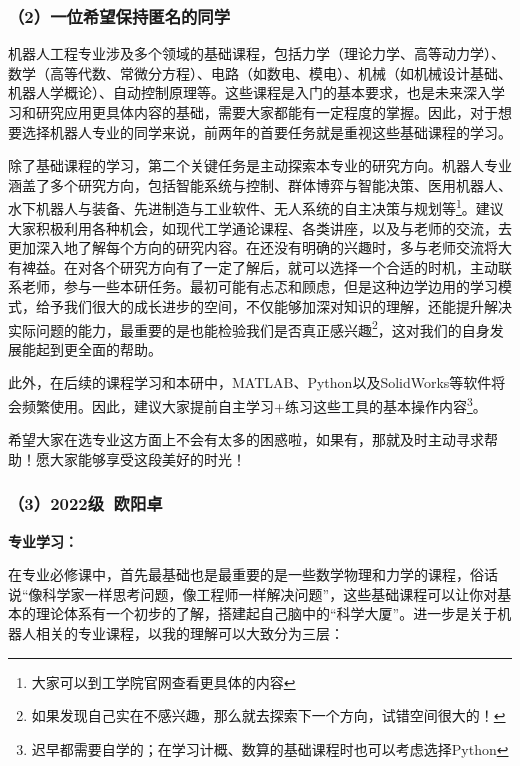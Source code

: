 \documentclass[11pt,oneside]{book}
\begin{document}
\subsubsection{（2）一位希望保持匿名的同学}
机器人工程专业涉及多个领域的基础课程，包括力学（理论力学、高等动力学）、数学（高等代数、常微分方程）、电路（如数电、模电）、机械（如机械设计基础、机器人学概论）、自动控制原理等。这些课程是入门的基本要求，也是未来深入学习和研究应用更具体内容的基础，需要大家都能有一定程度的掌握。因此，对于想要选择机器人专业的同学来说，前两年的首要任务就是重视这些基础课程的学习。

\vspace{10pt}

除了基础课程的学习，第二个关键任务是主动探索本专业的研究方向。机器人专业涵盖了多个研究方向，包括智能系统与控制、群体博弈与智能决策、医用机器人、水下机器人与装备、先进制造与工业软件、无人系统的自主决策与规划等\footnote{大家可以到工学院官网查看更具体的内容}。建议大家积极利用各种机会，如现代工学通论课程、各类讲座，以及与老师的交流，去更加深入地了解每个方向的研究内容。在还没有明确的兴趣时，多与老师交流将大有裨益。在对各个研究方向有了一定了解后，就可以选择一个合适的时机，主动联系老师，参与一些本研任务。最初可能有忐忑和顾虑，但是这种边学边用的学习模式，给予我们很大的成长进步的空间，不仅能够加深对知识的理解，还能提升解决实际问题的能力，最重要的是也能检验我们是否真正感兴趣\footnote{如果发现自己实在不感兴趣，那么就去探索下一个方向，试错空间很大的！}，这对我们的自身发展能起到更全面的帮助。

\vspace{10pt}

此外，在后续的课程学习和本研中，MATLAB、Python以及SolidWorks等软件将会频繁使用。因此，建议大家提前自主学习+练习这些工具的基本操作内容\footnote{迟早都需要自学的；在学习计概、数算的基础课程时也可以考虑选择Python}。

\vspace{10pt}

希望大家在选专业这方面上不会有太多的困惑啦，如果有，那就及时主动寻求帮助！愿大家能够享受这段美好的时光！

\subsubsection{（3）2022级\ 欧阳卓}
\textbf{专业学习：}

在专业必修课中，首先最基础也是最重要的是一些数学物理和力学的课程，俗话说“像科学家一样思考问题，像工程师一样解决问题”，这些基础课程可以让你对基本的理论体系有一个初步的了解，搭建起自己脑中的“科学大厦”。进一步是关于机器人相关的专业课程，以我的理解可以大致分为三层：
\end{document}
